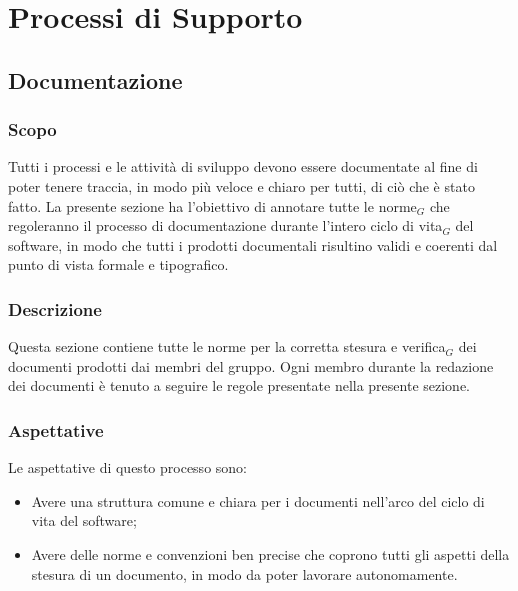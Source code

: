 \chapter{Processi di Supporto}

\section{Documentazione}
\subsection{Scopo}
Tutti i processi e le attività di sviluppo devono essere documentate al fine di poter tenere traccia, in modo più veloce e chiaro per tutti, di ciò che è stato fatto. La presente sezione ha l'obiettivo di annotare tutte le norme$_G$ che regoleranno il processo di documentazione durante l'intero ciclo di vita$_G$ del software, in modo che tutti i prodotti documentali risultino validi e coerenti dal punto di vista formale e tipografico.
\subsection{Descrizione}
Questa sezione contiene tutte le norme per la corretta stesura e verifica$_G$ dei documenti prodotti dai membri del gruppo. Ogni membro durante la redazione dei documenti è tenuto a seguire le regole presentate nella presente sezione.
\subsection{Aspettative}
Le aspettative di questo processo sono:
\begin{itemize}
    \item Avere una struttura comune e chiara per i documenti nell'arco del ciclo di vita del software;
    \item Avere delle norme e convenzioni ben precise che coprono tutti gli aspetti della stesura di un
documento, in modo da poter lavorare autonomamente.
\end{itemize}

